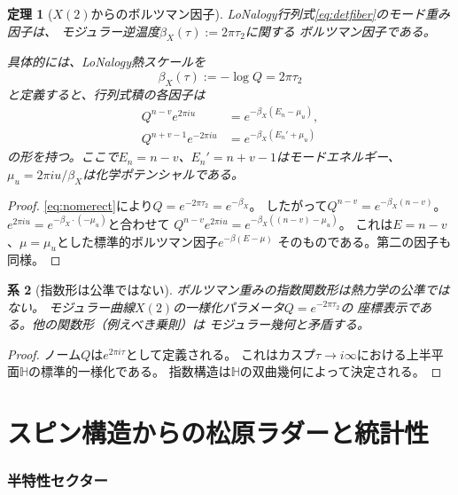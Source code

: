 \documentclass[12pt]{article}
\theoremstyle{plain}
\newtheorem{theorem}{定理}[section]
\newtheorem{corollary}[theorem]{系}
\theoremstyle{definition}
\numberwithin{equation}{section}
\newcommand{\HH}{\mathbb{H}}
\begin{document}
\begin{theorem}[$X(2)$からのボルツマン因子]\label{thm:boltzmann}
LoNalogy行列式\eqref{eq:detfiber}のモード重み因子は、
モジュラー逆温度$\beta_X(\tau):=2\pi\tau_2$に関する
ボルツマン因子である。

具体的には、LoNalogy熱スケールを
\begin{equation}\label{eq:betaX}
\boxed{\beta_X(\tau) := -\log Q = 2\pi\tau_2}
\end{equation}
と定義すると、行列式積の各因子は
\begin{align}
Q^{n-v}e^{2\pi iu}
&= e^{-\beta_X(E_n-\mu_u)},\\
Q^{n+v-1}e^{-2\pi iu}
&= e^{-\beta_X(E_n'+\mu_u)}
\end{align}
の形を持つ。ここで$E_n=n-v$、$E_n'=n+v-1$はモードエネルギー、
$\mu_u=2\pi iu/\beta_X$は化学ポテンシャルである。
\end{theorem}

\begin{proof}
\eqref{eq:nomerect}により$Q=e^{-2\pi\tau_2}=e^{-\beta_X}$。
したがって$Q^{n-v} = e^{-\beta_X(n-v)}$。
$e^{2\pi iu} = e^{-\beta_X\cdot(-\mu_u)}$と合わせて
$Q^{n-v}e^{2\pi iu} = e^{-\beta_X((n-v)-\mu_u)}$。
これは$E=n-v$、$\mu=\mu_u$とした標準的ボルツマン因子$e^{-\beta(E-\mu)}$
そのものである。第二の因子も同様。
\end{proof}

\begin{corollary}[指数形は公準ではない]
ボルツマン重みの指数関数形は熱力学の公準ではない。
モジュラー曲線$X(2)$の一様化パラメータ$Q=e^{-2\pi\tau_2}$の
座標表示である。他の関数形（例えべき乗則）は
モジュラー幾何と矛盾する。
\end{corollary}

\begin{proof}
ノーム$Q$は$e^{2\pi i\tau}$として定義される。
これはカスプ$\tau\to i\infty$における上半平面$\HH$の標準的一様化である。
指数構造は$\HH$の双曲幾何によって決定される。
\end{proof}


\part{スピン構造からの松原ラダーと統計性}

\section{半特性セクター}\label{sec:matsubara}
\end{document}

